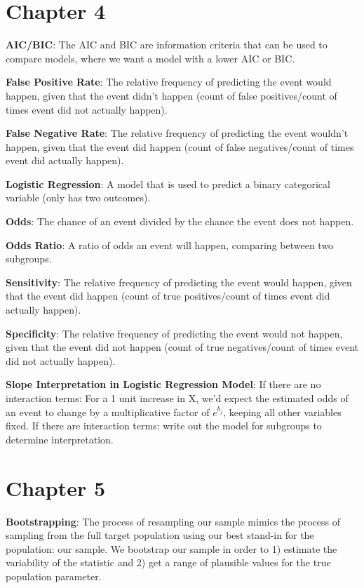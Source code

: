 \documentclass[
]{book}
\begin{document}
\section{Chapter 4}\label{chapter-4}

\textbf{AIC/BIC}: The AIC and BIC are information criteria that can be used to compare models, where we want a model with a lower AIC or BIC.

\textbf{False Positive Rate}: The relative frequency of predicting the event would happen, given that the event didn't happen (count of false positives/count of times event did not actually happen).

\textbf{False Negative Rate}: The relative frequency of predicting the event wouldn't happen, given that the event did happen (count of false negatives/count of times event did actually happen).

\textbf{Logistic Regression}: A model that is used to predict a binary categorical variable (only has two outcomes).

\textbf{Odds}: The chance of an event divided by the chance the event does not happen.

\textbf{Odds Ratio}: A ratio of odds an event will happen, comparing between two subgroups.

\textbf{Sensitivity}: The relative frequency of predicting the event would happen, given that the event did happen (count of true positives/count of times event did actually happen).

\textbf{Specificity}: The relative frequency of predicting the event would not happen, given that the event did not happen (count of true negatives/count of times event did not actually happen).

\textbf{Slope Interpretation in Logistic Regression Model}: If there are no interaction terms: For a 1 unit increase in X, we'd expect the estimated odds of an event to change by a multiplicative factor of \(e^{b_j}\), keeping all other variables fixed. If there are interaction terms: write out the model for subgroups to determine interpretation.

\section{Chapter 5}\label{chapter-5}

\textbf{Bootstrapping}: The process of resampling our sample mimics the process of sampling from the full target population using our best stand-in for the population: our sample. We bootstrap our sample in order to 1) estimate the variability of the statistic and 2) get a range of plausible values for the true population parameter.
\end{document}
